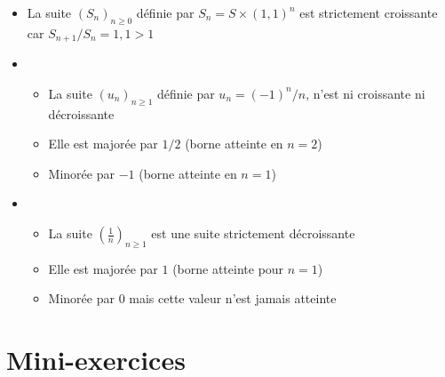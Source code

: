 \begin{frame}
\begin{exemple}

   \begin{itemize}
     \item La suite $(S_n)_{n\geq 0}$ définie par $S_n=S\times (1,1)^n$ est strictement croissante car $S_{n+1}/S_n=1,1>1$
     
 \pause
 
     \item 
 
     \begin{itemize} 
     
   
       \item La suite $(u_n)_{n\geq 1}$ définie par $u_n=(-1)^n/n$, 
n'est ni croissante ni décroissante

      
 \pause
       \item Elle est majorée par $1/2$ (borne atteinte en $n=2$)
     
 \pause       
       \item Minorée par $-1$ (borne atteinte en $n=1$)
     \end{itemize}


\pause
     \item 
     \begin{itemize}    
       \item La suite $\left(\frac1n\right)_{n\geq1}$ est une suite strictement décroissante
     
 \pause       
       \item Elle est majorée par $1$ (borne atteinte pour $n=1$)
     
 \pause       
       \item Minorée par $0$ mais cette valeur n'est jamais atteinte
     \end{itemize}       
   \end{itemize}
\end{exemple}

\end{frame}

\section*{Mini-exercices}

